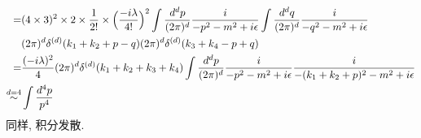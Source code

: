 \begin{itemize}
\begin{align}
		=& (4 \times 3)^2 \times 2 \times \frac{1}{2!} \times \Big( \frac{- i \lambda}{4!} \Big)^2 \int \frac{d^d p}{(2 \pi)^d} \frac{i}{- p^2 - m^2 + i \epsilon} \int \frac{d^d q}{(2 \pi)^d} \frac{i}{- q^2 - m^2 + i \epsilon} \notag \\
		& (2 \pi)^d \delta^{(d)}(k_1 + k_2 + p - q) (2 \pi)^d \delta^{(d)}(k_3 + k_4 - p + q) \notag \\
		=& \frac{(- i \lambda)^2}{4} (2 \pi)^d \delta^{(d)}(k_1 + k_2 + k_3 + k_4) \int \frac{d^d p}{(2 \pi)^d} \frac{i}{- p^2 - m^2 + i \epsilon} \frac{i}{- (k_1 + k_2 + p)^2 - m^2 + i \epsilon} \notag \\
		\overset{d = 4}{\sim} & \int \frac{d^4 p}{p^4}
	\end{align}
	同样, 积分发散.
\end{itemize}
